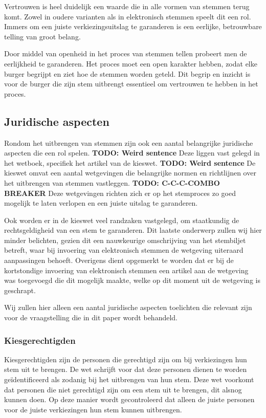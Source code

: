 \documentclass[a4paper]{article}
\newcommand{\TODO}[1]{{\color{red}\textbf{TODO: #1}}}
\begin{document}
Vertrouwen is heel duidelijk een waarde die in alle vormen van stemmen terug komt.
Zowel in oudere varianten als in elektronisch stemmen speelt dit een rol.
Immers om een juiste verkiezingsuitslag te garanderen is een eerlijke, betrouwbare telling van groot belang.

Door middel van openheid in het proces van stemmen tellen probeert men de eerlijkheid te garanderen.
Het proces moet een open karakter hebben, zodat elke burger begrijpt en ziet hoe de stemmen worden geteld.
Dit begrip en inzicht is voor de burger die zijn stem uitbrengt essentieel om vertrouwen te hebben in het proces.

\subsection{Juridische aspecten}
Rondom het uitbrengen van stemmen zijn ook een aantal belangrijke juridische aspecten die een rol spelen. \TODO{Weird sentence}
Deze liggen vast gelegd in het wetboek, specifiek het artikel van de kieswet. \TODO{Weird sentence}
De kieswet omvat een aantal wetgevingen die belangrijke normen en richtlijnen over het uitbrengen van stemmen vastleggen. \TODO{C-C-C-COMBO BREAKER}
Deze wetgevingen richten zich er op het stemproces zo goed mogelijk te laten verlopen en een juiste uitslag te garanderen.

Ook worden er in de kieswet veel randzaken vastgelegd, om staatkundig de rechtsgeldigheid van een stem te garanderen.
Dit laatste onderwerp zullen wij hier minder belichten, gezien dit een nauwkeurige omschrijving van het stembiljet betreft, waar bij invoering van elektronisch stemmen de wetgeving uiteraard aanpassingen behoeft.
Overigens dient opgemerkt te worden dat er bij de kortstondige invoering van elektronisch stemmen een artikel aan de wetgeving was toegevoegd die dit mogelijk maakte, welke op dit moment uit de wetgeving is geschrapt.

Wij zullen hier alleen een aantal juridische aspecten toelichten die relevant zijn voor de vraagstelling die in dit paper wordt behandeld.

\subsubsection{Kiesgerechtigden}
Kiesgerechtigden zijn de personen die gerechtigd zijn om bij verkiezingen hun stem uit te brengen.
De wet schrijft voor dat deze personen dienen te worden ge\"identificeerd als zodanig bij het uitbrengen van hun stem.
Deze wet voorkomt dat personen die niet gerechtigd zijn om een stem uit te brengen, dit alsnog kunnen doen.
Op deze manier wordt gecontroleerd dat alleen de juiste personen voor de juiste verkiezingen hun stem kunnen uitbrengen.
\end{document}
